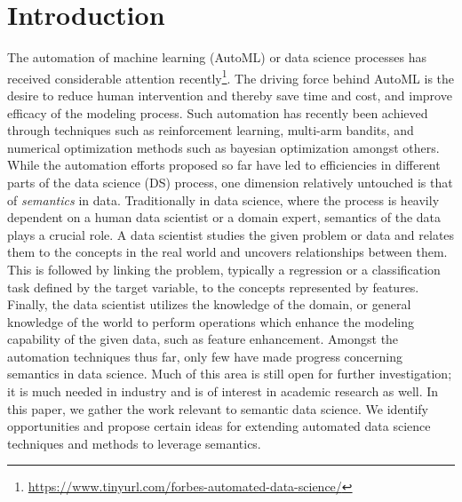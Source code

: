 \documentclass[sigconf, nonacm]{acmart}
\newcommand\vldbpagestyle{plain}
\begin{document}

\maketitle
\pagestyle{\vldbpagestyle}
\section{Introduction}


The automation of machine learning (AutoML) or data science processes has received considerable attention recently\footnote{\url{ https://www.tinyurl.com/forbes-automated-data-science/}\hspace{0.2cm}}. %
 The driving force behind AutoML is the desire to reduce human intervention and thereby save time and cost, and improve efficacy of the modeling process. Such automation has recently been achieved through techniques such as reinforcement learning, multi-arm bandits, and numerical optimization methods such as bayesian optimization amongst others. 
While the automation efforts proposed so far have led to efficiencies in different parts of the data science (DS) process, one dimension relatively untouched is that of {\em semantics} in data. Traditionally in data science, where the process is heavily dependent on a human data scientist or a domain expert, semantics of the data plays a crucial role. A data scientist studies the given problem or data and relates them to the concepts in the real world and uncovers relationships between them. This is followed by linking the problem, typically a regression or a classification task defined by the target variable, to the concepts represented by features. Finally, the data scientist utilizes the knowledge of the domain, or general knowledge of the world to perform operations which enhance the modeling capability of the given data, such as feature enhancement. 
Amongst the automation techniques thus far, only few have made progress concerning semantics in data science. Much of this area is still open for further investigation; it is much needed in industry and is of interest in academic research as well. In this paper, we gather the work relevant to semantic data science. We identify opportunities and propose certain ideas for extending automated data science techniques and methods to leverage semantics.
\end{document}
